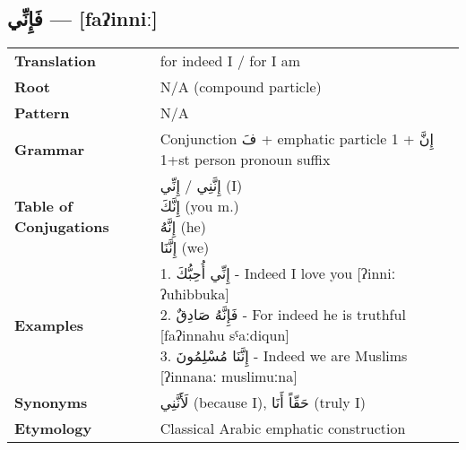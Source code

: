 \documentclass[a4paper,12pt]{article}
\begin{document}
\subsection{\textarabic{فَإِنِّي} — [faʔinniː]}
\begin{tabular}{p{3cm}p{10cm}}
\toprule
\textbf{Translation} & for indeed I / for I am \\
\textbf{Root} & N/A (compound particle) \\
\textbf{Pattern} & N/A \\
\textbf{Grammar} & Conjunction \textarabic{فَ} + emphatic particle 1 + \textarabic{إِنَّ} +1st person pronoun suffix \\
\textbf{Table of Conjugations} & \makecell[l]{
\textarabic{إِنَّنِي / إِنِّي} (I)\\
\textarabic{إِنَّكَ} (you m.)\\
\textarabic{إِنَّهُ} (he)\\
\textarabic{إِنَّنَا} (we)
} \\
\textbf{Examples} & \makecell[l]{\parbox{9.5cm}{
1. \textarabic{إِنِّي أُحِبُّكَ} - Indeed I love you [ʔinniː ʔuħibbuka]\\
2. \textarabic{فَإِنَّهُ صَادِقٌ} - For indeed he is truthful [faʔinnahu sˤaːdiqun]\\
3. \textarabic{إِنَّنَا مُسْلِمُونَ} - Indeed we are Muslims [ʔinnanaː muslimuːna]
}} \\
\midrule
\textbf{Synonyms} & \textarabic{لَأَنَّنِي} (because I), \textarabic{حَقّاً أَنَا} (truly I) \\
\textbf{Etymology} & Classical Arabic emphatic construction \\
\bottomrule
\end{tabular}
\end{document}
